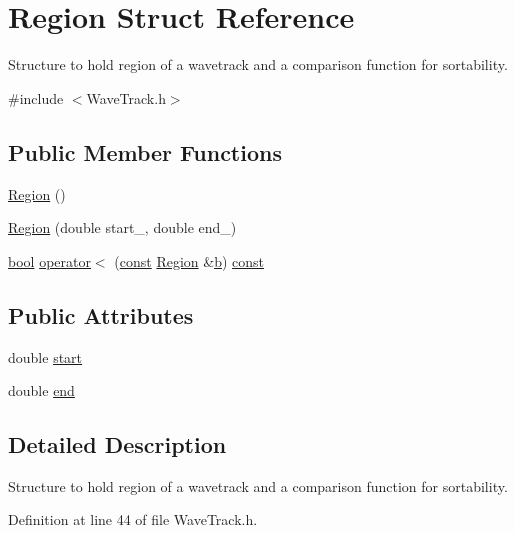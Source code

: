 \hypertarget{struct_region}{}\section{Region Struct Reference}
\label{struct_region}


Structure to hold region of a wavetrack and a comparison function for sortability.  




{\ttfamily \#include $<$Wave\+Track.\+h$>$}

\subsection*{Public Member Functions}
\begin{DoxyCompactItemize}
\item 
\hyperlink{struct_region_aa8796c9b4ac95da7f7ca4f374673800c}{Region} ()
\item 
\hyperlink{struct_region_a92e0b7ee37287d96a48aca9b4872054f}{Region} (double start\+\_\+, double end\+\_\+)
\item 
\hyperlink{mac_2config_2i386_2lib-src_2libsoxr_2soxr-config_8h_abb452686968e48b67397da5f97445f5b}{bool} \hyperlink{struct_region_afab55e114a1cc789ea49c40ccc0ea8b0}{operator$<$} (\hyperlink{getopt1_8c_a2c212835823e3c54a8ab6d95c652660e}{const} \hyperlink{struct_region}{Region} \&\hyperlink{convtest_8m_a21ad0bd836b90d08f4cf640b4c298e7c}{b}) \hyperlink{getopt1_8c_a2c212835823e3c54a8ab6d95c652660e}{const} 
\end{DoxyCompactItemize}
\subsection*{Public Attributes}
\begin{DoxyCompactItemize}
\item 
double \hyperlink{struct_region_a2241d9f45df2ea4dde3bd752bcb079c0}{start}
\item 
double \hyperlink{struct_region_ae97386d49f9f1ee231793ae71dd990d0}{end}
\end{DoxyCompactItemize}


\subsection{Detailed Description}
Structure to hold region of a wavetrack and a comparison function for sortability. 

Definition at line 44 of file Wave\+Track.\+h.



